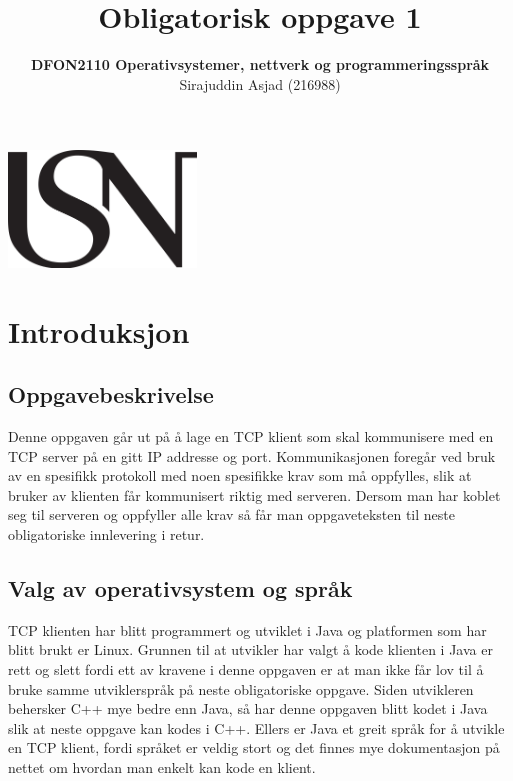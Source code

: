 \documentclass{article}
\title{\textbf{Obligatorisk oppgave 1}}
\author{\textbf{DFON2110 Operativsystemer, nettverk og programmeringsspråk}\\Sirajuddin Asjad (216988)}
\date{}
\begin{document}
	\begin{center}
		\includegraphics[width=5cm]{usn}
	\end{center}
	{\let\newpage\relax\maketitle}
	
	\newpage
	\renewcommand{\contentsname}{Innholdsfortegnelse}
	\tableofcontents
	
	\newpage
	\section{Introduksjon}
		\subsection{Oppgavebeskrivelse}
			Denne oppgaven går ut på å lage en TCP klient som skal kommunisere med en TCP server på en gitt IP addresse og port. Kommunikasjonen foregår ved bruk av en spesifikk protokoll med noen spesifikke krav som må oppfylles, slik at bruker av klienten får kommunisert riktig med serveren. Dersom man har koblet seg til serveren og oppfyller alle krav så får man oppgaveteksten til neste obligatoriske innlevering i retur.

		\subsection{Valg av operativsystem og språk}
			TCP klienten har blitt programmert og utviklet i Java og platformen som har blitt brukt er Linux. Grunnen til at utvikler har valgt å kode klienten i Java er rett og slett fordi ett av kravene i denne oppgaven er at man ikke får lov til å bruke samme utviklerspråk på neste obligatoriske oppgave. Siden utvikleren behersker C++ mye bedre enn Java, så har denne oppgaven blitt kodet i Java slik at neste oppgave kan kodes i C++. Ellers er Java et greit språk for å utvikle en TCP klient, fordi språket er veldig stort og det finnes mye dokumentasjon på nettet om hvordan man enkelt kan kode en klient.
\end{document}
